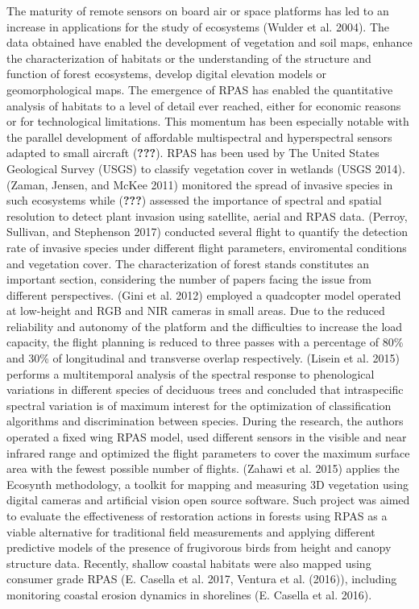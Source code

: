 \documentclass[]{interact}
\theoremstyle{plain}%
\theoremstyle{definition}
\theoremstyle{remark}
\begin{document}
The maturity of remote sensors on board air or space platforms has led
to an increase in applications for the study of ecosystems (Wulder et
al. 2004). The data obtained have enabled the development of vegetation
and soil maps, enhance the characterization of habitats or the
understanding of the structure and function of forest ecosystems,
develop digital elevation models or geomorphological maps. The emergence
of RPAS has enabled the quantitative analysis of habitats to a level of
detail ever reached, either for economic reasons or for technological
limitations. This momentum has been especially notable with the parallel
development of affordable multispectral and hyperspectral sensors
adapted to small aircraft ({\textbf{???}}). RPAS has been used by The
United States Geological Survey (USGS) to classify vegetation cover in
wetlands (USGS 2014). (Zaman, Jensen, and McKee 2011) monitored the
spread of invasive species in such ecosystems while ({\textbf{???}})
assessed the importance of spectral and spatial resolution to detect
plant invasion using satellite, aerial and RPAS data. (Perroy, Sullivan,
and Stephenson 2017) conducted several flight to quantify the detection
rate of invasive species under different flight parameters, enviromental
conditions and vegetation cover. The characterization of forest stands
constitutes an important section, considering the number of papers
facing the issue from different perspectives. (Gini et al. 2012)
employed a quadcopter model operated at low-height and RGB and NIR
cameras in small areas. Due to the reduced reliability and autonomy of
the platform and the difficulties to increase the load capacity, the
flight planning is reduced to three passes with a percentage of 80\% and
30\% of longitudinal and transverse overlap respectively. (Lisein et al.
2015) performs a multitemporal analysis of the spectral response to
phenological variations in different species of deciduous trees and
concluded that intraspecific spectral variation is of maximum interest
for the optimization of classification algorithms and discrimination
between species. During the research, the authors operated a fixed wing
RPAS model, used different sensors in the visible and near infrared
range and optimized the flight parameters to cover the maximum surface
area with the fewest possible number of flights. (Zahawi et al. 2015)
applies the Ecosynth methodology, a toolkit for mapping and measuring 3D
vegetation using digital cameras and artificial vision open source
software. Such project was aimed to evaluate the effectiveness of
restoration actions in forests using RPAS as a viable alternative for
traditional field measurements and applying different predictive models
of the presence of frugivorous birds from height and canopy structure
data. Recently, shallow coastal habitats were also mapped using consumer
grade RPAS (E. Casella et al. 2017, Ventura et al. (2016)), including
monitoring coastal erosion dynamics in shorelines (E. Casella et al.
2016).
\end{document}

